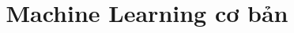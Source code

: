 \makeatletter
\def\thickhrulefill{\leavevmode \leaders \hrule height 1.2ex \hfill \kern \z@}
\def\@makechapterhead#1{
  \vspace*{10\p@}%
  {\parindent \z@ \centering \reset@font
        \thickhrulefill\quad
        \scshape\bfseries\textit{\@chapapp{}  \thechapter}
        \quad \thickhrulefill
        \par\nobreak
        \vspace*{10\p@}%
        \interlinepenalty\@M
        \hrule
        \vspace*{10\p@}%
        \Huge \bfseries #1 \par\nobreak
        \par
        \vspace*{10\p@}%
        \hrule
        \vskip 100\p@
  }}



\title{
{\centering \bf Machine Learning cơ bản}\\
\\
\\
\vspace{-1.2cm}
}



